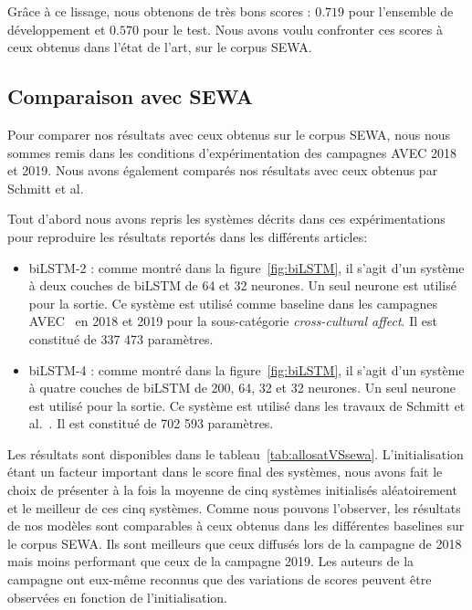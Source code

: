 

Grâce à ce lissage, nous obtenons de très bons scores : $0.719$ pour l'ensemble de développement et $0.570$ pour le test. Nous avons voulu confronter ces scores à ceux obtenus dans l'état de l'art, sur le corpus SEWA.

\subsection{Comparaison avec SEWA}
Pour comparer nos résultats avec ceux obtenus sur le corpus SEWA, nous nous sommes remis dans les conditions d'expérimentation des campagnes AVEC 2018 et 2019. Nous avons également comparés nos résultats avec ceux obtenus par Schmitt et al.

Tout d'abord nous avons repris les systèmes décrits dans ces expérimentations pour reproduire les résultats reportés dans les différents articles:

\begin{itemize}
  \item biLSTM-2 : comme montré dans la figure~\ref{fig:biLSTM}, il s'agit d'un système à deux couches de biLSTM de 64 et 32 neurones. Un seul neurone est utilisé pour la sortie. Ce système est utilisé comme baseline dans les campagnes AVEC~\cite{AVEC2018,AVEC2019} en 2018 et 2019 pour la sous-catégorie \textit{cross-cultural affect}. Il est constitué de 337 473 paramètres.
  \item biLSTM-4 : comme montré dans la figure~\ref{fig:biLSTM}, il s'agit d'un système à quatre couches de biLSTM de 200, 64, 32 et 32 neurones. Un seul neurone est utilisé pour la sortie. Ce système est utilisé dans les travaux de Schmitt et al.~\cite{Schmitt2019}. Il est constitué de 702 593 paramètres.
\end{itemize}



Les résultats sont disponibles dans le tableau~\ref{tab:allosatVSsewa}. L'initialisation étant un facteur important dans le score final des systèmes, nous avons fait le choix de présenter à la fois la moyenne de cinq systèmes initialisés aléatoirement et le meilleur de ces cinq systèmes. Comme nous pouvons l'observer, les résultats de nos modèles sont comparables à ceux obtenus dans les différentes baselines sur le corpus SEWA. Ils sont meilleurs que ceux diffusés lors de la campagne de 2018 mais moins performant que ceux de la campagne 2019. Les auteurs de la campagne ont eux-même reconnus que des variations de scores peuvent être observées en fonction de l'initialisation.

